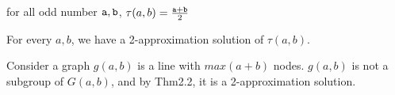\begin{corollary}
for all odd number $\mathtt{a},\mathtt{b}$, $\tau(a,b)=\frac{\mathtt{a}+\mathtt{b}}{2}$
\end{corollary}

\begin{theorem} 
For every $a,b$, we have a 2-approximation solution of  $\tau(a,b)$.
\end{theorem}
Consider a graph  $g(a,b)$ is a line with $max(a+b)$ nodes.  $g(a,b)$ is not a subgroup of  $G(a,b)$, and by Thm2.2, it is a 2-approximation solution.
